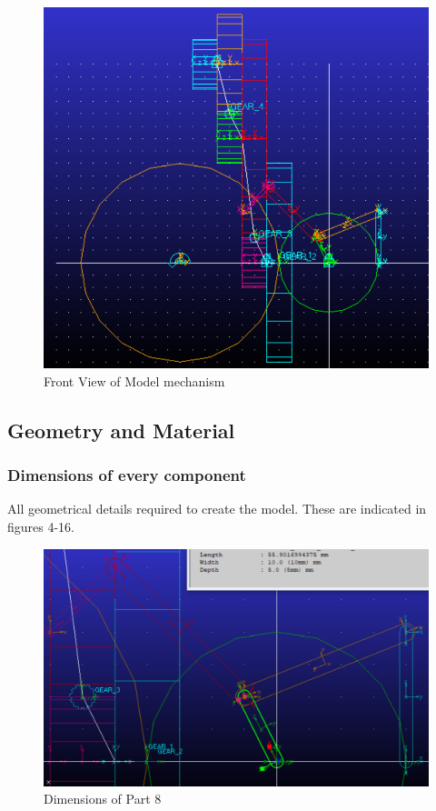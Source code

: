             \begin{figure}[hbt!]
                \centering
                \includegraphics[width=0.9\columnwidth]{Images/Model_fv.png}
                \caption{Front View of Model mechanism}
                \label{fig:model_fv}
            \end{figure}

        \subsection{Geometry and Material}
            \subsubsection{Dimensions of every component}
                All geometrical details required to create the model. These are indicated in figures 4-16.

                \begin{figure}[hbt!]
                    \centering
                    \includegraphics[width=0.9\columnwidth]{Images/dim8.png}
                    \caption{Dimensions of Part 8}
                    \label{fig:dim8}
                \end{figure}

